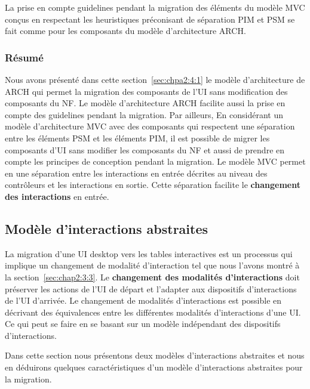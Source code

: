 La prise en compte guidelines pendant la migration des éléments du modèle MVC conçus en respectant les heuristiques préconisant de séparation PIM et PSM se fait comme pour les composants du modèle d'architecture ARCH.

\subsubsection{Résumé}
Nous avons présenté dans cette section~\ref{sec:chpa2:4:1} le modèle d'architecture de ARCH  qui permet la migration des composants de l'UI sans modification des composants du NF. Le modèle d'architecture ARCH facilite aussi la prise en compte des guidelines pendant la migration. Par ailleurs, En considérant un modèle d'architecture MVC avec des composants qui respectent une séparation entre les éléments PSM et les éléments PIM, il est possible de migrer les composants d'UI sans modifier les composants du NF et aussi de prendre en compte les principes de conception pendant la migration. Le modèle MVC permet en une séparation entre les interactions en entrée décrites au niveau des contrôleurs et les interactions en sortie. Cette séparation facilite le \textbf{changement des interactions} en entrée. 


\subsection{Modèle d'interactions abstraites}
\label{sec:chap2:4:2}
La migration d'une UI desktop  vers les tables interactives est un processus qui implique un changement de modalité d'interaction tel que nous l'avons montré à la section~\ref{sec:chap2:3:3}. Le \textbf{changement des modalités d'interactions} doit préserver les actions de l'UI de départ et l'adapter aux dispositifs d'interactions de l'UI d'arrivée. 
Le changement de modalités d'interactions est possible en décrivant des équivalences entre les différentes modalités d'interactions d'une UI. Ce qui peut se faire en se basant sur un modèle indépendant des dispositifs d'interactions.


Dans cette section nous présentons deux modèles d'interactions abstraites et nous en déduirons quelques caractéristiques d'un modèle d'interactions abstraites pour la migration.
 

